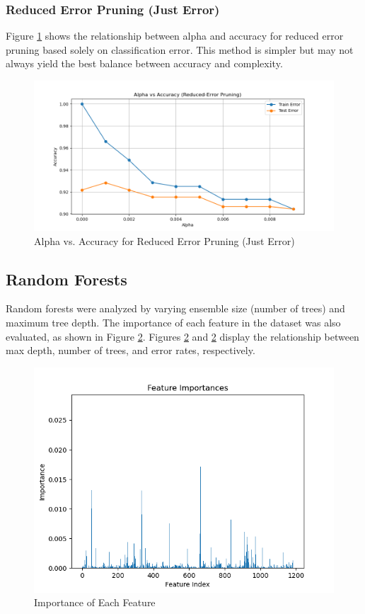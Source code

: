 \documentclass[12pt]{article}
\begin{document}
\subsubsection{Reduced Error Pruning (Just Error)}
Figure \ref{fig:error} shows the relationship between alpha and accuracy for reduced error pruning based solely on classification error. This method is simpler but may not always yield the best balance between accuracy and complexity.

\begin{figure}[h!]
    \centering
    \includegraphics[width=0.8\linewidth]{figures/Reduced Error Pruning/alpha vs accuracy.png}
    \caption{Alpha vs. Accuracy for Reduced Error Pruning (Just Error)}
    \label{fig:error}
\end{figure}

\subsection{Random Forests}
Random forests were analyzed by varying ensemble size (number of trees) and maximum tree depth. The importance of each feature in the dataset was also evaluated, as shown in Figure \ref{fig:mcc}. Figures \ref{fig:mcc} and \ref{fig:mcc} display the relationship between max depth, number of trees, and error rates, respectively.

\begin{figure}[h!]
    \centering
    \includegraphics[width=0.8\linewidth]{figures/Random Forests/Feature Importance.png}
    \caption{Importance of Each Feature}
    \label{fig:mcc}
\end{figure}
\end{document}
